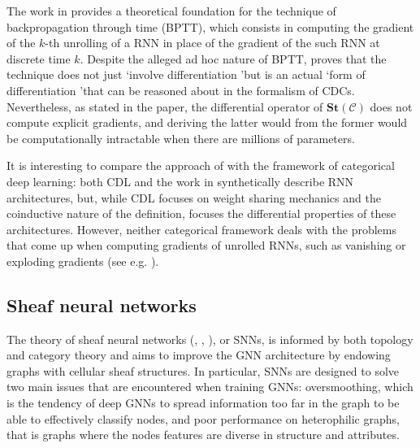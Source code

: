 \documentclass[11pt,a4paper,openright,twoside]{report}
\theoremstyle{plain}
\theoremstyle{definition}
\begin{document}
The work in \cite{sprunger2019differentiable} provides a theoretical foundation for the technique of backpropagation through time (BPTT), which consists in computing the gradient of the $k$-th unrolling of a RNN in place of the gradient of the such RNN at discrete time $k$. Despite the alleged ad hoc nature of BPTT, \cite{sprunger2019differentiable} proves that the technique does not just \lq involve differentiation \rq but is an actual \lq form of differentiation \rq that can be reasoned about in the formalism of CDCs. Nevertheless, as stated in the paper, the differential operator of $\mathbf{St}(\mathcal{C})$ does not compute explicit gradients, and deriving the latter would from the former would be computationally intractable when there are millions of parameters. 


It is interesting to compare the approach of \cite{sprunger2019differentiable} with the framework of categorical deep learning: both CDL and the work in \cite{sprunger2019differentiable} synthetically describe RNN architectures, but, while CDL focuses on weight sharing mechanics and the coinductive nature of the definition, \cite{sprunger2019differentiable} focuses the differential properties of these architectures. However, neither categorical framework deals with the problems that come up when computing gradients of unrolled RNNs, such as vanishing or exploding gradients (see e.g. \cite{hanin2018neural}). 


\subsection{Sheaf neural networks}

The theory of sheaf neural networks (\cite{hansen2020sheaf}, \cite{bodnar2022neural}, \cite{zaghen2024nonlinear}), or SNNs, is informed by both topology and category theory and aims to improve the GNN architecture by endowing graphs with cellular sheaf structures. In particular, SNNs are designed to solve two main issues that are encountered when training GNNs: oversmoothing, which is the tendency of deep GNNs to spread information too far in the graph to be able to effectively classify nodes, and poor performance on heterophilic graphs, that is graphs where the nodes features are diverse in structure and attributes.
\end{document}
